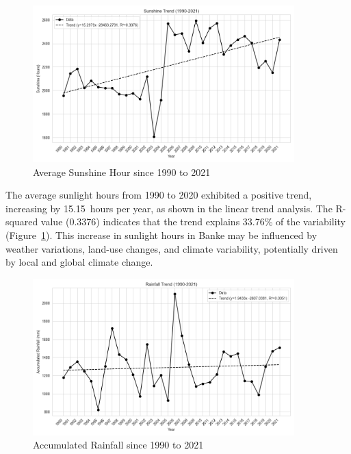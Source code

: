 \begin{figure}[H]
    \centering
    \caption{Average Sunshine Hour since 1990 to 2021} 
    \label{fig:trend_avg_sunshine_hour}
    \includegraphics[width=0.9\textwidth]{images/trend_avg_sunshine_hour.png}
\end{figure}

The average sunlight hours from 1990 to 2020 exhibited a positive trend, increasing by 15.15~hours per year, as shown in the linear trend analysis. The R-squared value (0.3376) indicates that the trend explains 33.76\% of the variability (Figure~\ref{fig:trend_avg_sunshine_hour}). This increase in sunlight hours in Banke may be influenced by weather variations, land-use changes, and climate variability, potentially driven by local and global climate change.


\begin{figure}[H]
    \centering
    \caption{Accumulated Rainfall since 1990 to 2021} 
    \label{fig:trend_accumulated_rainfall}
    \includegraphics[width=0.9\textwidth]{images/trend_accumulated_rainfall.png}
\end{figure}


